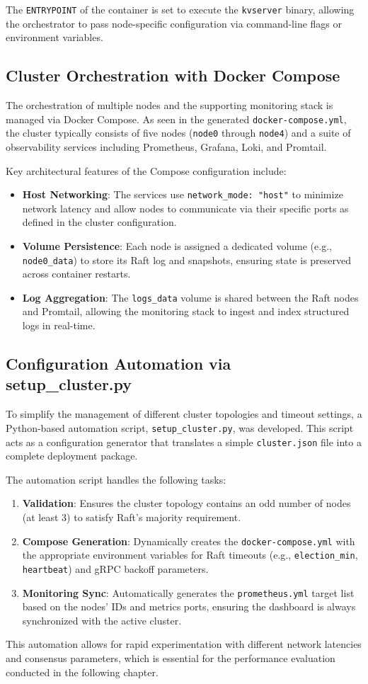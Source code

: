 The \texttt{ENTRYPOINT} of the container is set to execute the \texttt{kvserver} binary, allowing the orchestrator to pass node-specific configuration via command-line flags or environment variables.

\subsection{Cluster Orchestration with Docker Compose}
The orchestration of multiple nodes and the supporting monitoring stack is managed via Docker Compose. As seen in the generated \texttt{docker-compose.yml}, the cluster typically consists of five nodes (\texttt{node0} through \texttt{node4}) and a suite of observability services including Prometheus, Grafana, Loki, and Promtail.

Key architectural features of the Compose configuration include:
\begin{itemize}
    \item \textbf{Host Networking}: The services use \texttt{network\_mode: "host"} to minimize network latency and allow nodes to communicate via their specific ports as defined in the cluster configuration.
    \item \textbf{Volume Persistence}: Each node is assigned a dedicated volume (e.g., \texttt{node0\_data}) to store its Raft log and snapshots, ensuring state is preserved across container restarts.
    \item \textbf{Log Aggregation}: The \texttt{logs\_data} volume is shared between the Raft nodes and Promtail, allowing the monitoring stack to ingest and index structured logs in real-time.
\end{itemize}

\subsection{Configuration Automation via setup\_cluster.py}
To simplify the management of different cluster topologies and timeout settings, a Python-based automation script, \texttt{setup\_cluster.py}, was developed. This script acts as a configuration generator that translates a simple \texttt{cluster.json} file into a complete deployment package.

The automation script handles the following tasks:
\begin{enumerate}
    \item \textbf{Validation}: Ensures the cluster topology contains an odd number of nodes (at least 3) to satisfy Raft's majority requirement.
    \item \textbf{Compose Generation}: Dynamically creates the \texttt{docker-compose.yml} with the appropriate environment variables for Raft timeouts (e.g., \texttt{election\_min}, \texttt{heartbeat}) and gRPC backoff parameters.
    \item \textbf{Monitoring Sync}: Automatically generates the \texttt{prometheus.yml} target list based on the nodes' IDs and metrics ports, ensuring the dashboard is always synchronized with the active cluster.
\end{enumerate}

This automation allows for rapid experimentation with different network latencies and consensus parameters, which is essential for the performance evaluation conducted in the following chapter.